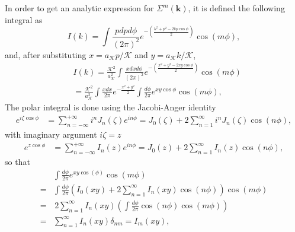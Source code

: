 \documentclass[english,aps,prd,nofootinbib,twocolumn]{revtex4-1}
\begin{document}
In order to get an analytic expression for $\Sigma^{m}(\mathbf{k })$, it is defined the following integral as
\begin{equation}
I(k)=\int \!\! \frac{p dp d\phi }{(2\pi)^2}
e^{-\left( 
\tfrac{k^{2}+p^{2}-2kp \cos \!\phi}{2} 
\right)}
\cos(m\phi),
\end{equation}
and, after substituting $x=a_{\mathcal{K}}p/\mathcal{K}$ and $y=a_{\mathcal{K}}k/\mathcal{K}$,
\begin{equation}
\label{eq:Self-energy-integral}
\begin{split}
&I(k)=\frac{\mathcal{K}^{2}}{a_{\mathcal{K}}^{2}}\!\!
\int \!\! \frac{x dx d\phi }{(2\pi)^2}
e^{-\left( 
\tfrac{x^{2}+y^{2}-2xy \cos \!\phi}{2} 
\right)}
\!\! \cos(m\phi) \\ &=
\frac{\mathcal{K}^{2}}{a_{\mathcal{K}}^{2}}\!\!
\int \!\! \frac{x dx}{2\pi}
e^{-\tfrac{x^{2}+y^{2}}{2} } \!\!
\int \!\! \frac{d\phi }{2\pi}
e^{xy \cos \!\phi} 
\! \cos(m\phi)
,
\end{split}
\end{equation}
The polar integral is done using the Jacobi-Anger identity
\begin{equation*}
\begin{split}
e^{i\zeta\cos\phi} \!&= \!\!\!
\sum_{n=-\infty}^{+\infty} \!\!\!\!
i^{n}J_{n}(\zeta)e^{in\phi}\!
= J_{0}(\zeta)\! + \!
2\sum_{n=1}^{\infty} \!
i^{n}J_{n}(\zeta)\cos(n\phi),
\end{split}
\end{equation*}
with imaginary argument $i\zeta=z$
\begin{equation}
\begin{split}
e^{z\cos\phi} \!&= \!\!\!\! 
\sum_{n=-\infty}^{+\infty} \!\!\!\!
I_{n}(z)e^{in\phi}\!
= J_{0}(z)\! + \!
2 \! \sum_{n=1}^{\infty} \!
I_{n}(z)\cos(n\phi),
\end{split}
\end{equation}
so that 
\begin{equation}
\begin{split}
&
\int \!\! \frac{d\phi }{2\pi}
e^{xy \cos(\phi)} 
\! \cos(m\phi)
\\=&
\int \!\! \frac{d\phi }{2\pi}
\left(
I_{0}(xy) + 
2\sum_{n=1}^{\infty}I_{n}(xy)\cos(n\phi)
\right)
\! \cos(m\phi)
\\=& \,
2\sum_{n=1}^{\infty}I_{n}(xy)
\left(
\int \!\! \frac{d\phi }{2\pi}
\cos(n\phi)\! \cos(m\phi)
\right)
\\=&
\sum_{n=1}^{\infty}I_{n}(xy) \delta_{nm}
= I_{m}(xy)
,
\end{split}
\end{equation}
\end{document}
